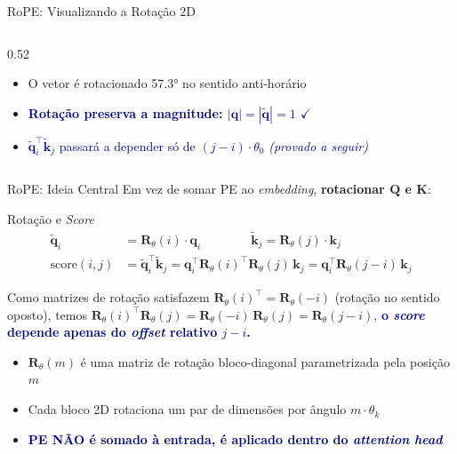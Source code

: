 \documentclass[aspectratio=169, xcolor=dvipsnames]{beamer}
\begin{document}
\begin{frame}{RoPE: Visualizando a Rotação 2D}
\begin{columns}
\begin{column}{0.52\textwidth}
        \begin{itemize}
          \item O vetor é rotacionado 57.3° no sentido anti-horário
          \item \textcolor{DarkBlue}{\textbf{Rotação preserva a magnitude: $|\mathbf{q}| = |\tilde{\mathbf{q}}| = 1$ $\checkmark$}}
          \item \textcolor{DarkBlue}{$\tilde{\mathbf{q}}_i^\top \tilde{\mathbf{k}}_j$ passará a depender só de $(j{-}i) \cdot \theta_0$ \textit{(provado a seguir)}}
        \end{itemize}
      \end{column}
    \end{columns}
  \end{frame}

  \begin{frame}{RoPE: Ideia Central}
    Em vez de somar PE ao \textit{embedding}, \textbf{rotacionar $\mathbf{Q}$ e $\mathbf{K}$}:

    \begin{block}{Rotação e \textit{Score}}
      \vspace{-0.5em}
      \begin{align*}
        \tilde{\mathbf{q}}_i &= \mathbf{R}_\theta(i) \cdot \mathbf{q}_i \qquad\qquad \tilde{\mathbf{k}}_j = \mathbf{R}_\theta(j) \cdot \mathbf{k}_j \\[4pt]
        \text{score}(i,j) &= \tilde{\mathbf{q}}_i^\top \tilde{\mathbf{k}}_j = \mathbf{q}_i^\top \mathbf{R}_\theta(i)^\top \mathbf{R}_\theta(j)\, \mathbf{k}_j = \mathbf{q}_i^\top \mathbf{R}_\theta(j{-}i)\, \mathbf{k}_j
      \end{align*}
    \end{block}

    Como matrizes de rotação satisfazem $\mathbf{R}_\theta(i)^\top = \mathbf{R}_\theta(-i)$ (rotação no sentido oposto), temos $\mathbf{R}_\theta(i)^\top \mathbf{R}_\theta(j) = \mathbf{R}_\theta(-i)\,\mathbf{R}_\theta(j) = \mathbf{R}_\theta(j{-}i)$, \textcolor{DarkBlue}{\textbf{o \textit{score} depende apenas do \textit{offset} relativo $j - i$.}}

    \begin{itemize}
      \item $\mathbf{R}_\theta(m)$ é uma matriz de rotação bloco-diagonal parametrizada pela posição $m$
      \item Cada bloco 2D rotaciona um par de dimensões por ângulo $m \cdot \theta_k$
      \item \textcolor{DarkBlue}{\textbf{PE NÃO é somado à entrada, é aplicado dentro do \textit{attention head}}}
    \end{itemize}
  \end{frame}
\end{document}
